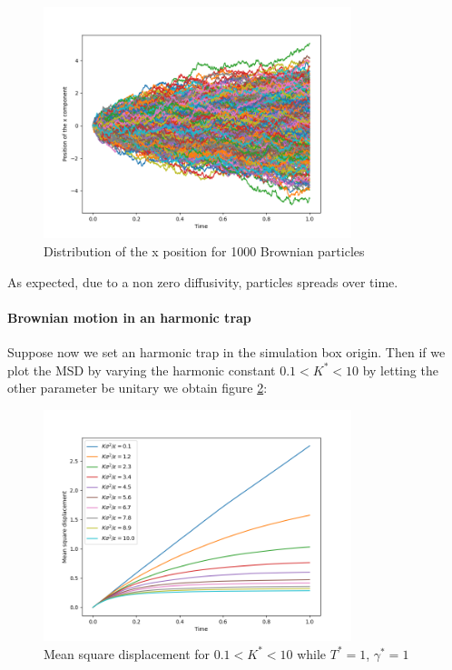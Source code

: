  \begin{figure}[htp]
    \centering
    \includegraphics[width=0.8\textwidth]{FIG/ex11/x_component.png}
    \caption{Distribution of the x position for 1000 Brownian particles}
    \label{ex11:x_pos}
\end{figure}

As expected, due to a non zero diffusivity, particles spreads over time.

\paragraph{Brownian motion in an harmonic trap} Suppose now we set an harmonic trap in the simulation box origin. 
Then if we plot the MSD by varying the harmonic constant $0.1 < K^* < 10$ by letting the other parameter be unitary we obtain figure \ref{ex11:msd_harm}:

\begin{figure}[htp]
    \centering
    \includegraphics[width=0.8\textwidth]{FIG/ex11/mds_hconst.png}
    \caption{Mean square displacement for $0.1 < K^* < 10$ while $T^* = 1$, $\gamma^* = 1$ }
    \label{ex11:msd_harm}
\end{figure}

